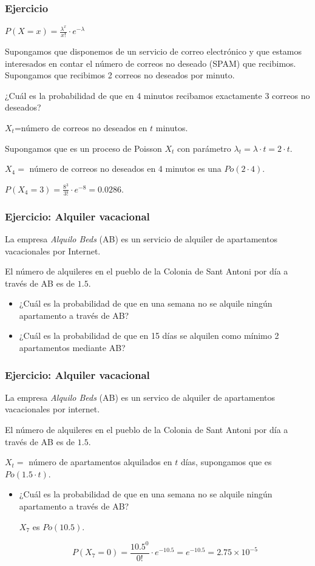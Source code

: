 \documentclass[handout]{beamer}\usepackage[]{graphicx}\usepackage[]{color}
\renewcommand{\emph}[1]{{\color{red}#1}}
\theoremstyle{plain}
\theoremstyle{definition}
\begin{document}
\begin{frame}
\frametitle{Ejercicio}

\emph{$P(X=x)=\frac{\lambda^x}{x!}\cdot e^{-\lambda}$}

Supongamos que disponemos de un servicio de correo electrónico y que estamos interesados en contar el número de correos no deseado (SPAM) que recibimos. Supongamos que recibimos 2 correos no deseados por  minuto.

¿Cuál es la probabilidad de que en 4 minutos recibamos exactamente 3 correos no deseados?


$X_t$=número de correos no deseados en $t$ minutos.


Supongamos que es un proceso de Poisson $X_t$ con parámetro 
$\lambda_t=\lambda\cdot t=2\cdot  t.$

$X_4=$ número de correos no deseados en 4 minutos es una $Po(2\cdot 4)$.

$P(X_4=3)=\frac{8^3}{3!}\cdot e^{-8}=0.0286$.
\end{frame}

\begin{frame}
\frametitle{Ejercicio: Alquiler  vacacional}

La empresa \textsl{Alquilo Beds} (AB)   es un servicio de alquiler de apartamentos vacacionales por Internet.

El número de alquileres  en  el pueblo de la Colonia de Sant Antoni  por día a través de AB es de  $1.5$.

\begin{itemize}
\item ¿Cuál es la probabilidad de que en una semana  no se alquile ningún apartamento a través de AB?
\item ¿Cuál es la probabilidad de que en 15 días se alquilen como mínimo 2 apartamentos mediante  AB?
\end{itemize}
\end{frame}

\begin{frame}
\frametitle{Ejercicio: Alquiler  vacacional}

La empresa \textsl{Alquilo Beds} (AB)   es un servico de alquiler de apartamentos vacacionales por internet.

El número de alquileres  en  el pueblo de la Colonia de Sant Antoni  por día a través de AB es de  $1.5$.

$X_t=$ número de apartamentos alquilados en $t$ días, supongamos que es $Po(1.5\cdot t)$.


\begin{itemize}
\item ¿Cuál es la probabilidad de que en una semana  no se alquile ningún apartamento a través de AB?

$X_7$ es $Po(10.5)$.

$$P(X_7=0)=\frac{10.5^0}{0!}\cdot e^{-10.5}=e^{-10.5}= \ensuremath{2.75\times 10^{-5}}$$
\end{itemize}
\end{frame}
\end{document}
